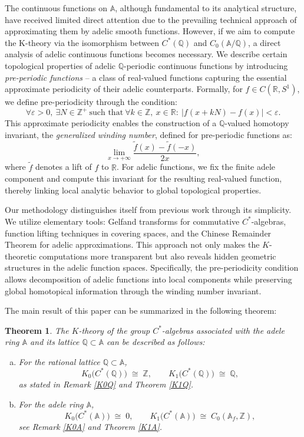 \documentclass[11pt]{article}
\newtheorem{theorem}{Theorem}[section]  %
\newcommand{\Z}{\mathbb{Z}}
\newcommand{\Q}{\mathbb{Q}}
\newcommand{\A}{\mathbb{A}}
\theoremstyle{remark}
\begin{document}
The continuous functions on $\mathbb{A}$, although fundamental to its analytical structure, have received limited direct attention due to the prevailing technical approach of approximating them by adelic smooth functions. However, if we aim to compute the K-theory via the isomorphism between \( C^*(\mathbb{Q}) \) and \( C_0(\A/\mathbb{Q}) \), a direct analysis of adelic continuous functions becomes necessary. We describe certain topological properties of adelic $\mathbb{Q}$-periodic continuous functions by introducing \textit{pre-periodic functions} – a class of real-valued functions capturing the essential approximate periodicity of their adelic counterparts. Formally, for $f \in C(\mathbb{R}, S^1)$, we define pre-periodicity through the condition:
$$
\forall \varepsilon > 0,\ \exists N\in \mathbb{Z}^+\ \text{such that}\ \forall k \in \mathbb{Z},\ x \in \mathbb{R}:\ |f(x + kN) - f(x)| < \varepsilon.
$$
This approximate periodicity  enables the construction of a $\mathbb{Q}$-valued homotopy invariant, the \textit{generalized winding number}, defined for pre-periodic functions as:
$$
\lim_{x\to+\infty}\frac{\tilde{f}(x)-\tilde{f}(-x)}{2x},
$$
where $\tilde{f}$ denotes a lift of $f$ to $\mathbb{R}$. For adelic functions, we fix the finite adele component and compute this invariant for the resulting real-valued function, thereby linking local analytic behavior to global topological properties.

Our methodology distinguishes itself from previous work through its simplicity. We utilize elementary tools: Gelfand transforms for commutative $C^*$-algebras, function lifting techniques in covering spaces, and the Chinese Remainder Theorem for adelic approximations. This approach not only makes the $K$-theoretic computations more transparent but also reveals hidden geometric structures in the adelic function spaces. Specifically, the pre-periodicity condition allows decomposition of adelic functions into local components while preserving global homotopical information through the winding number invariant.

The main result of this paper can be summarized in the following theorem:
\begin{theorem}\label{thm:main}
The $K$-theory of the group $C^*$-algebras associated with the adele ring $\A$ 
and its lattice $\Q\subset \A$ can be described as follows:
\begin{enumerate}[(a)]

\item For the rational lattice $\Q\subset \A$,
\[
K_0\bigl(C^*(\Q)\bigr) \;\cong\; \Z, 
\qquad
K_1\bigl(C^*(\Q)\bigr) \;\cong\; \Q,
\]
as stated in Remark \ref{K0Q} and Theorem \ref{K1Q}.
\item For the adele ring $\A$,
\[
K_0\bigl(C^*(\A)\bigr) \;\cong\; 0, 
\qquad
K_1\bigl(C^*(\A)\bigr) \;\cong\; C_0(\A_f,\Z),
\]
see Remark \ref{K0A} and Theorem \ref{K1A}.
\end{enumerate}
\end{theorem}
\end{document}

